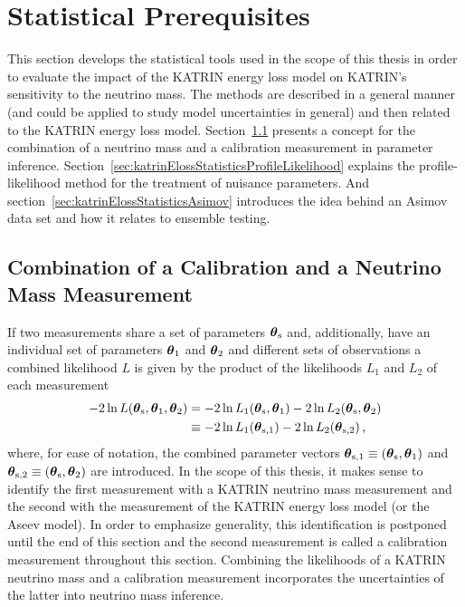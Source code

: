 \def\currentRootFolder{chapter/sensitivityStudyWithPreliminaryKatrinElossModel/statisticalPrerequisites}
\def\currentFigureFolder{\currentRootFolder/fig}



\section{Statistical Prerequisites}
\label{sec:katrinElossStatistics}
This section develops the statistical tools used in the scope of this thesis in order to evaluate the impact of the KATRIN energy loss model on KATRIN's sensitivity to the neutrino mass. The methods are described in a general manner (and could be applied to study model uncertainties in general) and then related to the KATRIN energy loss model. Section~\ref{sec:katrinElossStatisticsCombMeasurements} presents a concept for the combination of a neutrino mass and a calibration measurement in parameter inference. Section~\ref{sec:katrinElossStatisticsProfileLikelihood} explains the profile-likelihood method for the treatment of nuisance parameters. And section~\ref{sec:katrinElossStatisticsAsimov} introduces the idea behind an Asimov data set and how it relates to ensemble testing.

\subsection{Combination of a Calibration and a Neutrino Mass Measurement}
\label{sec:katrinElossStatisticsCombMeasurements}
If two measurements share a set of parameters $\boldsymbol{\mathbf{\theta}}_\mathrm{s}$ and, additionally, have an individual set of parameters $\boldsymbol{\mathbf{\theta}}_1$ and $\boldsymbol{\mathbf{\theta}}_2$ and different sets of observations a combined likelihood $L$ is given by the product of the likelihoods $L_1$ and $L_2$ of each measurement~\cite{ReviewOfParticlePhysics}
\newcommand{\paramVecSOne}{\paramVec_\mathrm{s,1}}
\newcommand{\paramVecSTwo}{\paramVec_\mathrm{s,2}}
\begin{align}
-2\ln L(\paramVecShared, \paramVec_1, \paramVec_2) &=  
-2\ln L_1(\paramVecShared, \paramVec_1)
-2\ln L_2(\paramVecShared, \paramVec_2)
\nonumber \\
&\equiv
-2\ln L_1(\paramVecSOne)
-2\ln L_2(\paramVecSTwo)
\label{eq:katrinElossStatisticsCombinedLikelihood}
\comma
\end{align}
where, for ease of notation, the combined parameter vectors $\boldsymbol{\mathbf{\theta}}_\mathrm{s,1}\equiv(\boldsymbol{\mathbf{\theta}}_\mathrm{s},\boldsymbol{\mathbf{\theta}}_1)$ and 
$\boldsymbol{\mathbf{\theta}}_\mathrm{s,2}\equiv(\boldsymbol{\mathbf{\theta}}_\mathrm{s},\boldsymbol{\mathbf{\theta}}_2)$ are introduced. In the scope of this thesis, it makes sense to identify the first measurement with a KATRIN neutrino mass measurement and the second with the measurement of the KATRIN energy loss model (or the Aseev model). In order to emphasize generality, this identification is postponed until the end of this section and the second measurement is called a calibration measurement throughout this section. Combining the likelihoods of a KATRIN neutrino mass and a calibration measurement incorporates the uncertainties of the latter into neutrino mass inference. 

